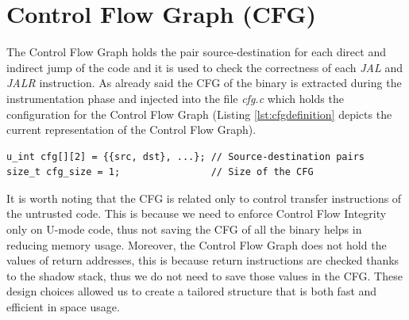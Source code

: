 \section{Control Flow Graph (CFG)}
\label{sec:project_cfg}

The Control Flow Graph holds the pair source-destination for each direct and indirect
jump of the code and it is used to check the correctness of each \textit{JAL}
and \textit{JALR} instruction. As already said the CFG of the binary is
extracted during the instrumentation phase and injected into the file \textit{cfg.c}
which holds the configuration for the Control Flow Graph (Listing
\ref{lst:cfgdefinition} depicts the current representation of the Control Flow
Graph). \\
\begin{lstlisting}[style=CStyle, caption= Definition of the Control Flow Graph inside \textit{cfg.c}, label={lst:cfgdefinition}]
u_int cfg[][2] = {{src, dst}, ...}; // Source-destination pairs
size_t cfg_size = 1;                // Size of the CFG
\end{lstlisting}

It is worth noting that the CFG is related only to control transfer instructions
of the untrusted code. This is because we need to enforce Control Flow Integrity
only on U-mode code, thus not saving the CFG of all the binary helps in reducing
memory usage. Moreover, the Control Flow Graph does not hold the values of return
addresses, this is because return instructions are checked thanks to the shadow
stack, thus we do not need to save those values in the CFG. These design choices
allowed us to create a tailored structure that is both fast and efficient in
space usage.

